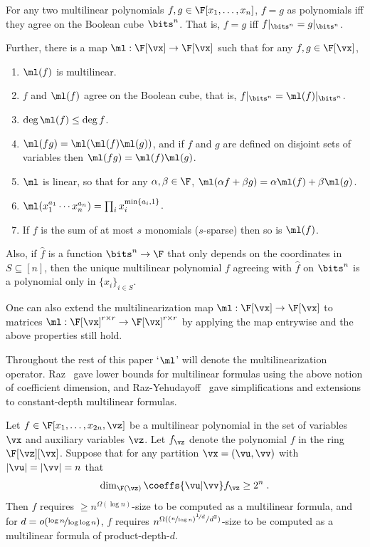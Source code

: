 \documentclass{toc}
\begin{document}
\begin{fact}\label{fact:multilinearization}
        For any two multilinear polynomials $f,g\in\F[x_1,\ldots,x_n]$, $f=g$ as polynomials iff they agree on the Boolean cube $\bits^n$.  That is, $f=g$ iff  $f|_{\bits^n}=g|_{\bits^n}$.

        Further, there is a  map $\ml:\F[\vx]\to\F[\vx]$ such that for any $f,g\in\F[\vx]$,
        \begin{enumerate}
                \item $\ml(f)$ is multilinear.
                \item $f$ and $\ml(f)$ agree on the Boolean cube, that is, $f|_{\bits^n}=\ml(f)|_{\bits^n}$.
                \item $\deg \ml(f)\le \deg f$.
                \item $\ml(fg)=\ml(\ml(f)\ml(g))$, and if $f$ and $g$ are defined on disjoint sets of variables then $\ml(fg)= \ml(f)\ml(g)$.
                \item $\ml$ is linear, so that for any $\alpha,\beta\in \F$, $\ml(\alpha f+\beta g)=\alpha \ml(f)+\beta\ml(g)$.
                \item $\ml(x_1^{a_1}\cdots x_n^{a_n})=\prod_i x_i^{\min\{a_i,1\}}$.
                \item If $f$ is the sum of at most $s$ monomials ($s$-sparse) then so is $\ml(f)$.
        \end{enumerate}
        Also, if $\hat{f}$ is a function $\bits^n\to\F$ that only depends on the coordinates in $S\subseteq[n]$, then the unique multilinear polynomial $f$ agreeing with $\hat{f}$ on $\bits^n$ is a polynomial only in $\{x_i\}_{i\in S}$.

        One can also extend the multilinearization map $\ml:\F[\vx]\to\F[\vx]$ to matrices $\ml:\F[\vx]^{r\times r}\to\F[\vx]^{r\times r}$ by applying the map
%
entrywise   %
and the above properties still hold.
\end{fact}

Throughout the rest of this paper `$\ml$' will denote the multilinearization operator. Raz~\cite{Raz09,Raz06} gave lower bounds for multilinear formulas using the above notion of coefficient dimension, and Raz-Yehudayoff~\cite{RazYehudayoff08,RazYehudayoff09} gave simplifications and extensions to constant-depth multilinear formulas.

\begin{theoremwp}\label{thm:full-rank-lb}
        Let $f\in\F[x_1,\ldots,x_{2n},\vz]$ be a multilinear polynomial in the set of variables $\vx$ and auxiliary variables $\vz$.  Let $f_\vz$ denote the polynomial $f$ in the ring $\F[\vz][\vx]$.  Suppose that for any partition $\vx=(\vu,\vv)$ with $|\vu|=|\vv|=n$ that
        \[
                \dim_{\F(\vz)} \coeffs{\vu|\vv} f_\vz \ge 2^n
                \;.
        \]
        Then $f$ requires $\ge n^{\Omega(\log n)}$-size to be computed as a multilinear formula, and for $d=o(\nicefrac{\log n}{\log\log n})$, $f$ requires $n^{\Omega((\nicefrac{n}{\log n})^{\nicefrac{1}{d}}/d^2)}$-size to be computed as a multilinear formula of product-depth-$d$.
\end{theoremwp}
\end{document}
